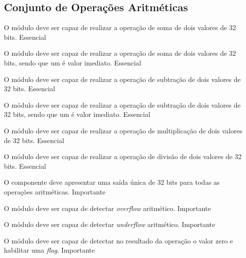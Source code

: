 \subsection{Conjunto de Operações Aritméticas} 
  
    \begin{functional}
      {O módulo deve ser capaz de realizar a operação de soma de dois valores de 32 bits.}
      {Essencial}
      
      {O módulo deve ser capaz de realizar a operação de soma de dois valores de 32 bits, sendo que um é valor imediato.}
      {Essencial}

      {O módulo deve ser capaz de realizar a operação de subtração de dois valores de 32 bits.}
      {Essencial}
      
      {O módulo deve ser capaz de realizar a operação de subtração de dois valores de 32 bits, sendo que um é valor imediato.}
      {Essencial}

      {O módulo deve ser capaz de realizar a operação de multiplicação de dois valores de 32 bits. }
      {Essencial}

      {O módulo deve ser capaz de realizar a operação de divisão de dois valores de 32 bits.}
      {Essencial} 
     

      {O componente deve apresentar uma saída única de 32 bits para todas as operações aritméticas.}
      {Importante}       

      {O módulo deve ser capaz de detectar \textit{overflow} aritmético.}
      {Importante}
      
      {O módulo deve ser capaz de detectar \textit{underflow} aritmético.}
      {Importante}
      
      {O módulo deve ser capaz de detectar no resultado da operação o valor zero e habilitar uma \textit{flag}.}
      {Importante}
      
    \end{functional}
